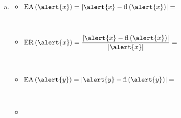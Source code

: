 \begin{frame}
\begin{solution}
\begin{enumerate}[a)]
\begin{multicols}{2}
\begin{itemize}
					      \item

					            \begin{math}
						            \operatorname{fl}\left(\alert{y}\right)=
					            \end{math}
				      \end{itemize}
			      \end{multicols}

			\item

			      \begin{multicols}{2}
				      \begin{itemize}

					      \item

					            \begin{math}
						            \operatorname{EA}\left(\alert{x}\right)=
						            \left
						            |\alert{x}-
						            \operatorname{fl}\left(\alert{x}\right)
						            \right|=
					            \end{math}

					            \

					      \item

					            \begin{math}
						            \operatorname{ER}\left(\alert{x}\right)=
						            \dfrac{
							            \left|
							            \alert{x}-
							            \operatorname{fl}\left(\alert{x}\right)
							            \right|}{
							            \left|
							            \alert{x}
							            \right|}=
					            \end{math}

					            \

					      \item

					            \begin{math}
						            \operatorname{EA}\left(\alert{y}\right)=
						            \left|
						            \alert{y}-
						            \operatorname{fl}\left(\alert{y}\right)
						            \right|=
					            \end{math}

					            \

					      \item


\end{itemize}
\end{multicols}
\end{enumerate}
\end{solution}
\end{frame}

